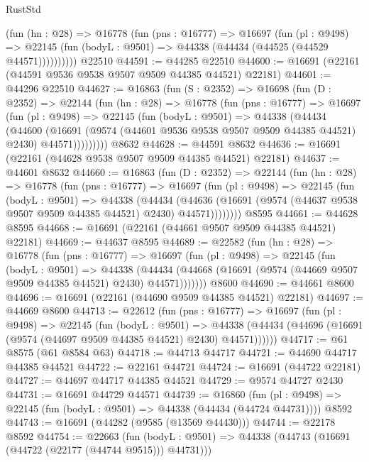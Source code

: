 \begin{lexlean}{RustStd}
\begin{coremodule}
          (fun (hn : @28) =>
          @16778
            (fun (pns : @16777) =>
            @16697
              (fun (pl : @9498) =>
              @22145 (fun (bodyL : @9501) => @44338 (@44434 (@44525 (@44529 @44571))))))))))
    @22510
@44591 := @44285 @22510
@44600 := @16691 (@22161 (@44591 @9536 @9538 @9507 @9509 @44385 @44521) @22181)
@44601 := @44296 @22510
@44627 := @16863
    (fun (S : @2352) =>
    @16698
      (fun (D : @2352) =>
      @22144
        (fun (hn : @28) =>
        @16778
          (fun (pns : @16777) =>
          @16697
            (fun (pl : @9498) =>
            @22145
              (fun (bodyL : @9501) =>
              @44338
                (@44434
                  (@44600
                    (@16691
                      (@9574 (@44601 @9536 @9538 @9507 @9509 @44385 @44521) @2430)
                      @44571)))))))))
    @8632
@44628 := @44591 @8632
@44636 := @16691 (@22161 (@44628 @9538 @9507 @9509 @44385 @44521) @22181)
@44637 := @44601 @8632
@44660 := @16863
    (fun (D : @2352) =>
    @22144
      (fun (hn : @28) =>
      @16778
        (fun (pns : @16777) =>
        @16697
          (fun (pl : @9498) =>
          @22145
            (fun (bodyL : @9501) =>
            @44338
              (@44434
                (@44636
                  (@16691 (@9574 (@44637 @9538 @9507 @9509 @44385 @44521) @2430) @44571))))))))
    @8595
@44661 := @44628 @8595
@44668 := @16691 (@22161 (@44661 @9507 @9509 @44385 @44521) @22181)
@44669 := @44637 @8595
@44689 := @22582
    (fun (hn : @28) =>
    @16778
      (fun (pns : @16777) =>
      @16697
        (fun (pl : @9498) =>
        @22145
          (fun (bodyL : @9501) =>
          @44338
            (@44434 (@44668 (@16691 (@9574 (@44669 @9507 @9509 @44385 @44521) @2430) @44571)))))))
    @8600
@44690 := @44661 @8600
@44696 := @16691 (@22161 (@44690 @9509 @44385 @44521) @22181)
@44697 := @44669 @8600
@44713 := @22612
    (fun (pns : @16777) =>
    @16697
      (fun (pl : @9498) =>
      @22145
        (fun (bodyL : @9501) =>
        @44338 (@44434 (@44696 (@16691 (@9574 (@44697 @9509 @44385 @44521) @2430) @44571))))))
@44717 := @61 @8575 (@61 @8584 @63)
@44718 := @44713 @44717
@44721 := @44690 @44717 @44385 @44521
@44722 := @22161 @44721
@44724 := @16691 (@44722 @22181)
@44727 := @44697 @44717 @44385 @44521
@44729 := @9574 @44727 @2430
@44731 := @16691 @44729 @44571
@44739 := @16860
    (fun (pl : @9498) => @22145 (fun (bodyL : @9501) => @44338 (@44434 (@44724 @44731))))
    @8592
@44743 := @16691 (@44282 (@9585 (@13569 @44430)))
@44744 := @22178 @8592
@44754 := @22663
    (fun (bodyL : @9501) => @44338 (@44743 (@16691 (@44722 (@22177 (@44744 @9515))) @44731)))

\end{coremodule}
\end{lexlean}
